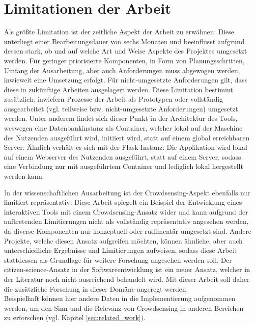 \section{Limitationen der Arbeit}
\label{sec:limitations}
Als größte Limitation ist der zeitliche Aspekt der Arbeit zu erwähnen: Diese unterliegt einer Bearbeitungsdauer von sechs Monaten und beeinflusst aufgrund dessen stark, ob und auf welche Art und Weise Aspekte des Projektes umgesetzt werden. Für geringer priorisierte Komponenten, in Form von Planungsschritten, Umfang der Ausarbeitung, aber auch Anforderungen muss abgewogen werden, inwieweit eine Umsetzung erfolgt. Für nicht-umgesetzte Anforderungen gilt, dass diese in zukünftige Arbeiten ausgelagert werden. Diese Limitation bestimmt zusätzlich, inwiefern Prozesse der Arbeit als Prototypen oder vollständig ausgearbeitet (vgl. teilweise bzw. nicht-umgesetzte Anforderungen) umgesetzt werden. Unter anderem findet sich dieser Punkt in der Architektur des Tools, weswegen eine Datenbankinstanz als Container, welcher lokal auf der Maschine des Nutzenden ausgeführt wird, initiiert wird, statt auf einem global erreichbaren Server. Ähnlich verhält es sich mit der Flask-Instanz: Die Applikation wird lokal auf einem Webserver des Nutzenden ausgeführt, statt auf einem Server, sodass eine Verbindung nur mit ausgeführtem Container und lediglich lokal hergestellt werden kann.

In der wissenschaftlichen Ausarbeitung ist der Crowdsensing-Aspekt ebenfalls nur limitiert repräsentativ: Diese Arbeit spiegelt ein Beispiel der Entwicklung eines interaktiven Tools mit einem Crowdsensing-Ansatz wider und kann aufgrund der auftretenden Limitierungen nicht als vollständig repräsentativ angesehen werden, da diverse Komponenten nur konzeptuell oder rudimentär umgesetzt sind. Andere Projekte, welche diesen Ansatz aufgreifen möchten, können ähnliche, aber auch unterschiedliche Ergebnisse und Limitierungen aufweisen, sodass diese Arbeit stattdessen als Grundlage für weitere Forschung angesehen werden soll. Der citizen-science-Ansatz in der Softwareentwicklung ist ein neuer Ansatz, welcher in der Literatur noch nicht ausreichend behandelt wird. Mit dieser Arbeit soll daher die zusätzliche Forschung in dieser Domäne angeregt werden. \\ Beispielhaft können hier andere Daten in die Implementierung aufgenommen werden, um den Sinn und die Relevanz von Crowdsensing in anderen Bereichen zu erforschen (vgl. Kapitel \ref{sec:related_work}).

